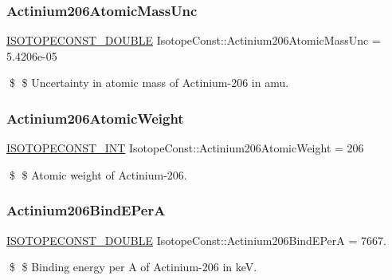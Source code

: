 \subsubsection{\texorpdfstring{Actinium206\+Atomic\+Mass\+Unc}{Actinium206AtomicMassUnc}}
{\footnotesize\ttfamily \mbox{\hyperlink{group___isotope_const-_macros_ga8f45a7272ce02c0b4c65c44636ed719a}{I\+S\+O\+T\+O\+P\+E\+C\+O\+N\+S\+T\+\_\+\+D\+O\+U\+B\+LE}} Isotope\+Const\+::\+Actinium206\+Atomic\+Mass\+Unc = 5.\+4206e-\/05}

\$ \$ Uncertainty in atomic mass of Actinium-\/206 in amu. \mbox{\label{group___isotope_const-_actinium-_ac206_ga4e7ed9398536487d028202b60fc72996}} 
\subsubsection{\texorpdfstring{Actinium206\+Atomic\+Weight}{Actinium206AtomicWeight}}
{\footnotesize\ttfamily \mbox{\hyperlink{group___isotope_const-_macros_ga5f18360b3e99483a35c32d789e62621c}{I\+S\+O\+T\+O\+P\+E\+C\+O\+N\+S\+T\+\_\+\+I\+NT}} Isotope\+Const\+::\+Actinium206\+Atomic\+Weight = 206}

\$ \$ Atomic weight of Actinium-\/206. \mbox{\label{group___isotope_const-_actinium-_ac206_ga70c984ba3c6f079f92b5f893f0701817}} 
\subsubsection{\texorpdfstring{Actinium206\+Bind\+E\+PerA}{Actinium206BindEPerA}}
{\footnotesize\ttfamily \mbox{\hyperlink{group___isotope_const-_macros_ga8f45a7272ce02c0b4c65c44636ed719a}{I\+S\+O\+T\+O\+P\+E\+C\+O\+N\+S\+T\+\_\+\+D\+O\+U\+B\+LE}} Isotope\+Const\+::\+Actinium206\+Bind\+E\+PerA = 7667.}

\$ \$ Binding energy per A of Actinium-\/206 in keV. \mbox{\label{group___isotope_const-_actinium-_ac206_gad076217d21b18517a7858fe7aaf35828}} 
